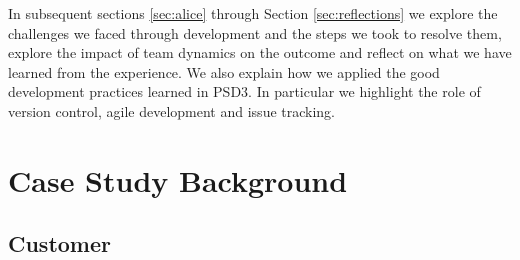 \documentclass{l3proj}
\begin{document}
In subsequent sections \ref{sec:alice} through Section \ref{sec:reflections} we explore the challenges we faced through development and the steps we took to resolve them, explore the impact of team dynamics on the outcome and reflect on what we have learned from the experience. We also explain how we applied the good development practices learned in PSD3. In particular we highlight the role of version control, agile development and issue tracking.

\newpage



\section{Case Study Background}
\label{sec:background}


\subsection{Customer}
\label{customer}

\end{document}
